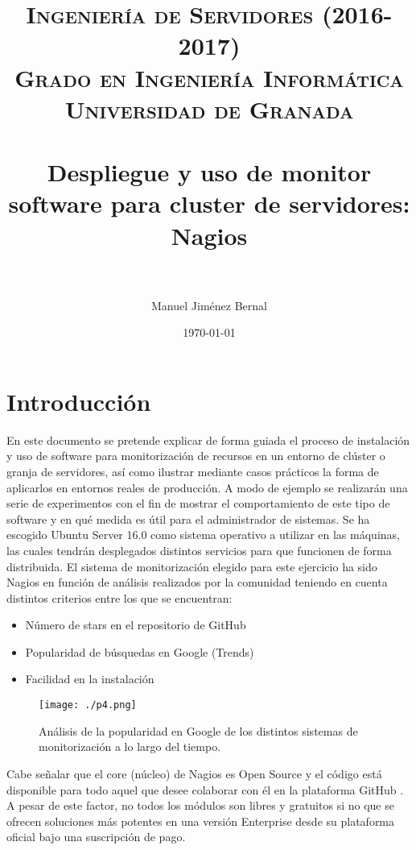 \documentclass[paper=a4, fontsize=12pt]{scrartcl} %
\title{	
\normalfont \normalsize 
\textsc{{ Ingeniería de Servidores (2016-2017)} \\ Grado en Ingeniería Informática \\ Universidad de Granada} \\ [25pt] %
\horrule{0.5pt} \\[0.4cm] %
\huge Despliegue y uso de monitor software para cluster de servidores: Nagios \\ %
\horrule{2pt} \\[0.5cm] %
}
\author{Manuel Jim\'enez Bernal} %
\date{\normalsize\today} %
\begin{document}
\maketitle %
\newpage
\tableofcontents %

\listoffigures
\newpage


\section{Introducción}
En este documento se pretende explicar de forma guiada el proceso de instalación y uso de software para monitorización de recursos en un entorno de clúster o granja de servidores, así como ilustrar mediante casos prácticos la forma de aplicarlos  en entornos reales de producción. A modo de ejemplo se realizarán una serie de experimentos con el fin de mostrar el comportamiento de este tipo de software y en qué medida es útil para el administrador de sistemas. Se ha escogido Ubuntu Server 16.0 como sistema operativo a utilizar en las máquinas, las cuales tendrán desplegados distintos servicios para que funcionen de forma distribuida.
El sistema de monitorización elegido para este ejercicio ha sido Nagios en función de análisis realizados por la comunidad teniendo en cuenta distintos criterios entre los que se encuentran:

\begin{itemize}
	\item Número de stars en el repositorio de GitHub \cite{p4}
	\item Popularidad de búsquedas en Google (Trends) \cite{p5}
	\item Facilidad en la instalación
\end{itemize}

\begin{figure}[H] %
	\centering
	\label{lsblk}
	\texttt{[image: ./p4.png]}
	\caption{Análisis de la popularidad en Google de los distintos sistemas de monitorización a lo largo del tiempo.} 
\end{figure}

Cabe señalar que el core (núcleo) de Nagios es Open Source y el código está disponible para todo aquel que desee colaborar con él en la plataforma GitHub \cite{p4}. A pesar de este factor, no todos los módulos son libres y gratuitos si no que se ofrecen soluciones más potentes en una versión Enterprise desde su plataforma oficial bajo una suscripción de pago. 
	
\end{document}
